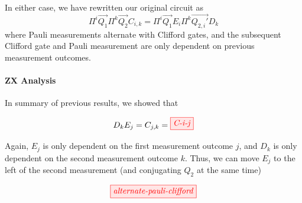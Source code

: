In either case, we have rewritten our original circuit as
$$
\Pi^i \vec{Q_1} \Pi^k\vec{Q_2} C_{i, k} = \Pi^i \vec{Q_1} E_i  \Pi^k\vec{Q_{2, i}'} D_{k}
$$
where Pauli measurements alternate with Clifford gates, and the subsequent Clifford gate and Pauli measurement are only dependent on previous measurement outcomes.

\paragraph{ZX Analysis}

In summary of previous results, we showed that 

$$
D_k E_j = C_{j , k} = \tikzfig{C-i-j}
$$

Again, $E_j$ is only dependent on the first measurement outcome $j$, and $D_k$ is only dependent on the second measurement outcome $k$. 
Thus, we can move $E_j$ to the left of the second measurement (and conjugating $Q_2$ at the same time)

$$
\tikzfig{alternate-pauli-clifford}
$$
